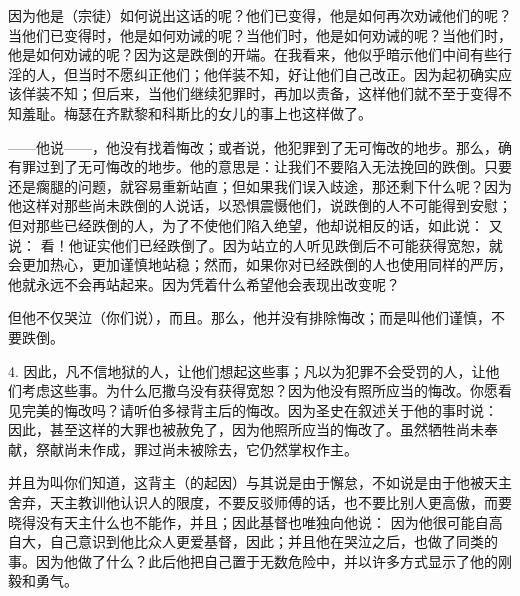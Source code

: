 因为他是（宗徒）如何说出这话的呢？他们已变得，他是如何再次劝诫他们的呢？当他们已变得时，他是如何劝诫的呢？当他们时，他是如何劝诫的呢？当他们时，他是如何劝诫的呢？因为这是跌倒的开端。在我看来，他似乎暗示他们中间有些行淫的人，但当时不愿纠正他们；他佯装不知，好让他们自己改正。因为起初确实应该佯装不知；但后来，当他们继续犯罪时，再加以责备，这样他们就不至于变得不知羞耻。梅瑟在齐默黎和科斯比的女儿的事上也这样做了。\par

——他说——，他没有找着悔改；或者说，他犯罪到了无可悔改的地步。那么，确有罪过到了无可悔改的地步。他的意思是：让我们不要陷入无法挽回的跌倒。只要还是瘸腿的问题，就容易重新站直；但如果我们误入歧途，那还剩下什么呢？因为他这样对那些尚未跌倒的人说话，以恐惧震慑他们，说跌倒的人不可能得到安慰；但对那些已经跌倒的人，为了不使他们陷入绝望，他却说相反的话，如此说： 又说： 看！他证实他们已经跌倒了。因为站立的人听见跌倒后不可能获得宽恕，就会更加热心，更加谨慎地站稳；然而，如果你对已经跌倒的人也使用同样的严厉，他就永远不会再站起来。因为凭着什么希望他会表现出改变呢？\par

但他不仅哭泣（你们说），而且。那么，他并没有排除悔改；而是叫他们谨慎，不要跌倒。\par

4. 因此，凡不信地狱的人，让他们想起这些事；凡以为犯罪不会受罚的人，让他们考虑这些事。为什么厄撒乌没有获得宽恕？因为他没有照所应当的悔改。你愿看见完美的悔改吗？请听伯多禄背主后的悔改。因为圣史在叙述关于他的事时说： 因此，甚至这样的大罪也被赦免了，因为他照所应当的悔改了。虽然牺牲尚未奉献，祭献尚未作成，罪过尚未被除去，它仍然掌权作主。\par

并且为叫你们知道，这背主（的起因）与其说是由于懈怠，不如说是由于他被天主舍弃，天主教训他认识人的限度，不要反驳师傅的话，也不要比别人更高傲，而要晓得没有天主什么也不能作，并且；因此基督也唯独向他说： 因为他很可能自高自大，自己意识到他比众人更爱基督，因此；并且他在哭泣之后，也做了同类的事。因为他做了什么？此后他把自己置于无数危险中，并以许多方式显示了他的刚毅和勇气。\par

